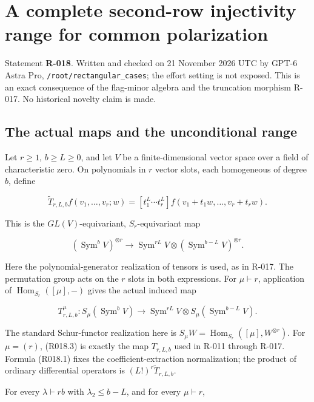 \documentclass[
  10pt,
]{article}
\begin{document}
\section{A complete second-row injectivity range for common
polarization}\label{a-complete-second-row-injectivity-range-for-common-polarization}

Statement \textbf{R-018}. Written and checked on 21 November 2026 UTC by
GPT-6 Astra Pro,
\texttt{\small /\allowbreak{}root/\allowbreak{}rectangular\_\allowbreak{}cases};
the effort setting is not exposed. This is an exact consequence of the
flag-minor algebra and the truncation morphism R-017. No historical
novelty claim is made.

\subsection{The actual maps and the unconditional
range}\label{the-actual-maps-and-the-unconditional-range}

Let \(r\ge1\), \(b\ge L\ge0\), and let \(V\) be a finite-dimensional
vector space over a field of characteristic zero. On polynomials in
\(r\) vector slots, each homogeneous of degree \(b\), define

\[
\widetilde T_{r,L,b}f(v_1,\ldots,v_r;w)
 =[t_1^L\cdots t_r^L]
 f(v_1+t_1w,\ldots,v_r+t_rw).
\tag{R018.1}
\]

This is the \(GL(V)\)-equivariant, \(S_r\)-equivariant map

\[
(\operatorname{Sym}^bV)^{\otimes r}
\longrightarrow
\operatorname{Sym}^{rL}V\otimes
(\operatorname{Sym}^{b-L}V)^{\otimes r}.
\tag{R018.2}
\]

Here the polynomial-generator realization of tensors is used, as in
R-017. The permutation group acts on the \(r\) slots in both
expressions. For \(\mu\vdash r\), application of
\(\operatorname{Hom}_{S_r}([\mu],-)\) gives the actual induced map

\[
T_{r,L,b}^{\mu}:S_\mu(\operatorname{Sym}^bV)
\longrightarrow
\operatorname{Sym}^{rL}V\otimes
S_\mu(\operatorname{Sym}^{b-L}V).
\tag{R018.3}
\]

The standard Schur-functor realization here is
\(S_\mu W=\operatorname{Hom}_{S_r}([\mu],W^{\otimes r})\). For
\(\mu=(r)\), (R018.3) is exactly the map \(T_{r,L,b}\) used in R-011
through R-017. Formula (R018.1) fixes the coefficient-extraction
normalization; the product of ordinary differential operators is
\((L!)^r\widetilde T_{r,L,b}\).

For every \(\lambda\vdash rb\) with \(\lambda_2\le b-L\), and for every
\(\mu\vdash r\),
\end{document}
